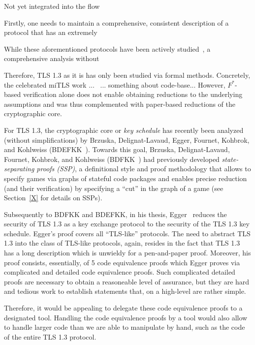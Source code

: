 {\color{gray} Not yet integrated into the flow




 
Firstly, one needs to maintain a comprehensive, consistent description of
a protocol that has an extremely 



While these aforementioned protocols have been actively studied~\cite{X}, a comprehensive analysis without 


Therefore, TLS 1.3 as it is has only been studied via formal methods. Concretely, the celebrated miTLS work ...~\cite{X} ... something about code-base... However, $F^*$-based verification alone does not enable obtaining reductions to the underlying assumptions and was thus complemented with paper-based reductions of the cryptographic core.

For TLS 1.3, the cryptographic core or \emph{key schedule} has recently been analyzed (without simplifications) by Brzuska, Delignat-Lavaud, Egger, Fournet, Kohbrok, and Kohlweiss (BDEFKK~\cite{X}).
Towards this goal, Brzuska, Delignat-Lavaud, Fournet, Kohbrok, and Kohlweiss (BDFKK~\cite{X}) had previously developed \emph{state-separating proofs (SSP)}, a definitional style and proof methodology that allows to specify games via graphs of stateful code packages and enables precise reduction (and their verification) by
specifying a ``cut'' in the graph of a game (see Section~\ref{X} for details on SSPs).

Subsequently to BDFKK and BDEFKK, in his thesis, Egger~\cite{X} reduces the security of TLS 1.3 as a key exchange protocol to the security of the TLS 1.3 key schedule. Egger's proof covers all ``TLS-like'' protocols. The need to abstract TLS 1.3 into the class of TLS-like protocols, again, resides in the fact that TLS 1.3 has a long description which is unwieldy for a pen-and-paper proof. Moreover, his proof consists, essentially, of 5 code equivalence proofs which Egger proves via complicated and detailed code equivalence proofs. Such complicated detailed proofs are necessary to obtain a reasoneable level of assurance, but they are hard and tedious work to establish statements that, on a high-level are rather simple.

Therefore, it would be appealing to delegate these code equivalence proofs to
a designated tool. Handling the code equivalence proofs by a tool would also
allow to handle larger code than we are able to manipulate by hand, such as the
code of the entire TLS 1.3 protocol.

}
